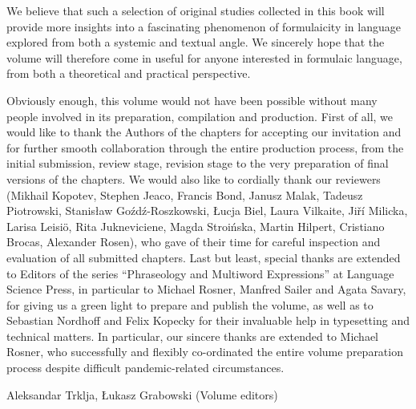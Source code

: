 \documentclass[output=paper]{langsci/langscibook}
\begin{document}
We believe that such a selection of original studies collected in this book will provide more insights into a fascinating phenomenon of formulaicity in language explored from both a systemic and textual angle. We sincerely hope that the volume will therefore come in useful for anyone interested in formulaic language, from both a theoretical and practical perspective.



Obviously enough, this volume would not have been possible without many people involved in its preparation, compilation and production. First of all, we would like to thank the Authors of the chapters for accepting our invitation and for further smooth collaboration through the entire production process, from the initial submission, review stage, revision stage to the very preparation of final versions of the chapters. We would also like to cordially thank our reviewers (Mikhail Kopotev, Stephen Jeaco, Francis Bond, Janusz Malak, Tadeusz Piotrowski, Stanisław Goźdź-Roszkowski, Łucja Biel, Laura Vilkaite, Jiří Milicka, Larisa Leisiö, Rita Jukneviciene, Magda Stroińska, Martin Hilpert, Cristiano Brocas, Alexander Rosen), who gave of their time for careful inspection and evaluation of all submitted chapters. Last but least, special thanks are extended to Editors of the series “Phraseology and Multiword Expressions” at Language Science Press, in particular to Michael Rosner, Manfred Sailer and Agata Savary, for giving us a green light to prepare and publish the volume, as well as to Sebastian Nordhoff and Felix Kopecky for their invaluable help in typesetting and technical matters. In particular, our sincere thanks are extended to Michael Rosner, who successfully and flexibly co-ordinated the entire volume preparation process despite difficult pandemic-related circumstances. 



Aleksandar Trklja, Łukasz Grabowski (Volume editors)

 
\sloppy\printbibliography[heading=subbibliography,notkeyword=this]
\end{document}

